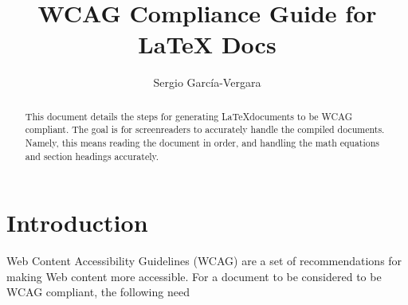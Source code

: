 \documentclass{llncs}
\begin{document}
% 


\title{WCAG Compliance Guide for LaTeX Docs}

\author{Sergio Garc\'{i}a-Vergara}


\maketitle




\begin{abstract}
  This document details the steps for generating \LaTeX documents to be WCAG
  compliant. The goal is for screenreaders to accurately handle the compiled
  documents. Namely, this means reading the document in order, and handling the
  math equations and section headings accurately.


\end{abstract}



\section{Introduction}

Web Content Accessibility Guidelines (WCAG) are a set of recommendations for
making Web content more accessible. For a document to be considered to be WCAG
compliant, the following need
\end{document}
